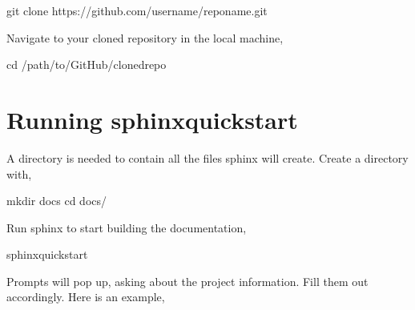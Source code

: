\documentclass[letterpaper,10pt,english]{sphinxhowto}
\begin{document}
\begin{sphinxVerbatim}[commandchars=\\\{\}]
\PYGZdl{} git clone https://github.com/\PYGZlt{}user\PYGZhy{}name\PYGZgt{}/\PYGZlt{}repo\PYGZhy{}name\PYGZgt{}.git
\end{sphinxVerbatim}

\sphinxAtStartPar
Navigate to your cloned repository in the local machine,

\begin{sphinxVerbatim}[commandchars=\\\{\}]
\PYGZdl{} cd /path/to/GitHub/cloned\PYGZhy{}repo
\end{sphinxVerbatim}


\section{Running sphinx\sphinxhyphen{}quickstart}
\label{\detokenize{index:running-sphinx-quickstart}}
\sphinxAtStartPar
A  directory is needed to contain all the files sphinx will create. Create a  directory with,

\begin{sphinxVerbatim}[commandchars=\\\{\}]
\PYGZdl{} mkdir docs
\PYGZdl{} cd docs/
\end{sphinxVerbatim}

\sphinxAtStartPar
Run sphinx to start building the documentation,

\begin{sphinxVerbatim}[commandchars=\\\{\}]
\PYGZdl{} sphinx\PYGZhy{}quickstart
\end{sphinxVerbatim}

\sphinxAtStartPar
Prompts will pop up, asking about the project information. Fill them out accordingly. Here is an example,

\begin{sphinxVerbatim}[commandchars=\\\{\}]
   
    
   \PYG{p}{[}\PYG{p}{]} 
   \PYG{p}{[}\PYG{p}{]}       
\end{sphinxVerbatim}
\end{document}
